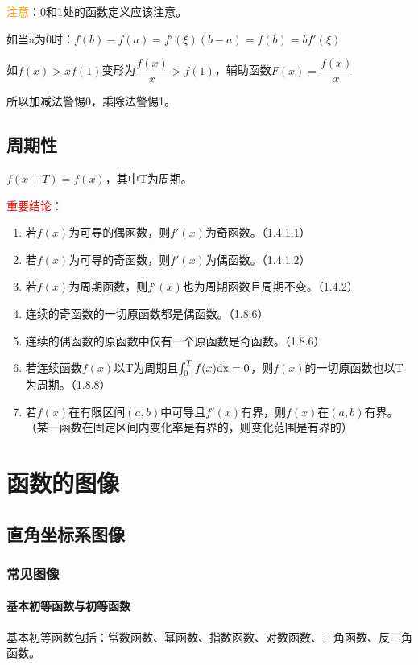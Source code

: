 \documentclass[UTF8, 12pt]{ctexart}
\begin{document}
\textcolor{orange}{注意}：0和1处的函数定义应该注意。

如当a为0时：$f(b)-f(a)=f'(\xi )(b-a)=f(b)=bf'(\xi)$

如$f(x)>xf(1)$变形为$\dfrac{f(x)}{x}>f(1)$，辅助函数$F(x)=\dfrac{f(x)}{x}$

所以加减法警惕0，乘除法警惕1。

\subsection{周期性}

$f(x+T)=f(x)$，其中T为周期。 \bigskip

\textcolor{red}{重要结论：}

\begin{enumerate}
    \item 若$f(x)$为可导的偶函数，则$f'(x)$为奇函数。（1.4.1.1）
    \item 若$f(x)$为可导的奇函数，则$f'(x)$为偶函数。（1.4.1.2）
    \item 若$f(x)$为周期函数，则$f'(x)$也为周期函数且周期不变。（1.4.2）
    \item 连续的奇函数的一切原函数都是偶函数。（1.8.6）
    \item 连续的偶函数的原函数中仅有一个原函数是奇函数。（1.8.6）
    \item 若连续函数$f(x)$以T为周期且$\int_{0}^{T}f(x)\rm{d}x=0$，则$f(x)$的一切原函数也以T为周期。（1.8.8）
    \item 若$f(x)$在有限区间$(a,b)$中可导且$f'(x)$有界，则$f(x)$在$(a,b)$有界。（某一函数在固定区间内变化率是有界的，则变化范围是有界的）
\end{enumerate}

\section{函数的图像}
\subsection{直角坐标系图像}
\subsubsection{常见图像}
\paragraph{基本初等函数与初等函数} \leavevmode \bigskip

基本初等函数包括：常数函数、幂函数、指数函数、对数函数、三角函数、反三角函数。
\end{document}
